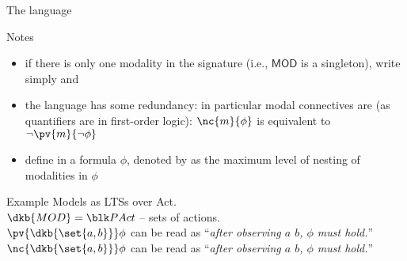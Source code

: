 \documentclass{beamer}
\begin{document}
\begin{slide}{The language}\label{s:11}
\small
\begin{block}{Notes}
\begin{itemize}
\item if there is only one modality in the signature (i.e., $\mathsf{MOD}$ is a singleton), write simply \dgold{$\eventual \phi$} and \dgold{$\always \phi$}
\item the language has some redundancy: in particular modal connectives are  (as quantifiers are in first-order logic):
$\nc{m}{\phi}$ is equivalent to  $\neg \pv{m}{\neg \phi}$
\item define  in a formula $\phi$, denoted by \dgold{$\mdepth{\phi}$} as the maximum level of nesting of modalities in $\phi$
\end{itemize}
\end{block}

\begin{exampleblock}{Example}
  Models as LTSs over Act.\\
  $\dkb{MOD} = \blk P {Act}$ -- sets of actions.\\
  $\pv{\dkb{\set{a,b}}} \phi$ can be read as ``\emph{after observing $a$
 $b$, $\phi$ must hold.}''\\
  $\nc{\dkb{\set{a,b}}} \phi$ can be read as ``\emph{after observing $a$  $b$, $\phi$ must hold.}''
\end{exampleblock}

\end{slide}
\end{document}
